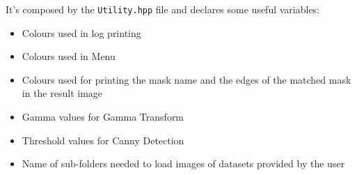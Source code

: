 \documentclass{article}
\begin{document}
\begin{itemize}
{It's composed by the \texttt{Utility.hpp} file and declares some useful variables:
\begin{itemize}
\item{Colours used in log printing}
\item{Colours used in Menu}
\item{Colours used for printing the mask name and the edges of the matched mask in the result image}
\item{Gamma values for Gamma Transform}
\item{Threshold values for Canny Detection}
\item{Name of sub-folders needed to load images of datasets provided by the user}
\end{itemize}
}
\end{itemize}
\end{document}
